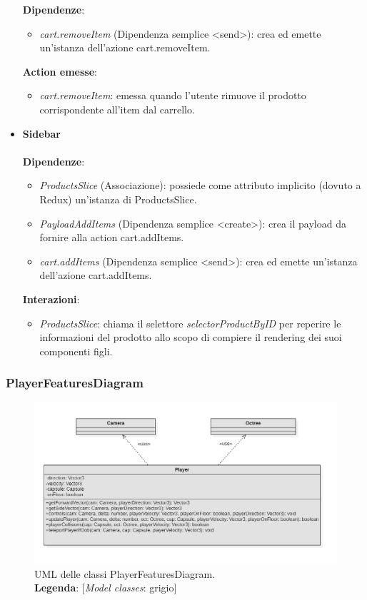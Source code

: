 \begin{itemize}
	\textbf{Dipendenze}: 
	\begin{itemize}
		\item \textit{cart.removeItem} (Dipendenza semplice \textless send\textgreater): crea ed emette un'istanza dell'azione cart.removeItem.
	\end{itemize}
	\textbf{Action emesse}:
	\begin{itemize}
		\item \textit{cart.removeItem}: emessa quando l'utente rimuove il prodotto corrispondente all'item dal carrello.
	\end{itemize}
	\item \textbf{Sidebar}
	\\\\
	\textbf{Dipendenze}:
	\begin{itemize}
		\item \textit{ProductsSlice} (Associazione): possiede come attributo implicito (dovuto a Redux) un'istanza di ProductsSlice.
		\item \textit{PayloadAddItems} (Dipendenza semplice \textless create\textgreater): crea il payload da fornire alla action cart.addItems.
		\item \textit{cart.addItems} (Dipendenza semplice \textless send\textgreater): crea ed emette un'istanza dell'azione cart.addItems.
		\end{itemize}
		\textbf{Interazioni}:
		\begin{itemize}
			\item \textit{ProductsSlice}: chiama il selettore \textit{selectorProductByID} per reperire le informazioni del prodotto 
			allo scopo di compiere il rendering dei suoi componenti figli.
		\end{itemize}
\end{itemize}
		\subsubsection{PlayerFeaturesDiagram}
		\begin{figure}[H]
			\centering
			\includegraphics[scale=0.6, keepaspectratio]{./res/images/playerFeaturesDiagram.PNG}
			\caption[UML delle classi PlayerFeaturesDiagram]{
				UML delle classi PlayerFeaturesDiagram.
				\\
				\textbf{Legenda}: 
				[\textit{Model classes}: grigio]}
			\end{figure}
